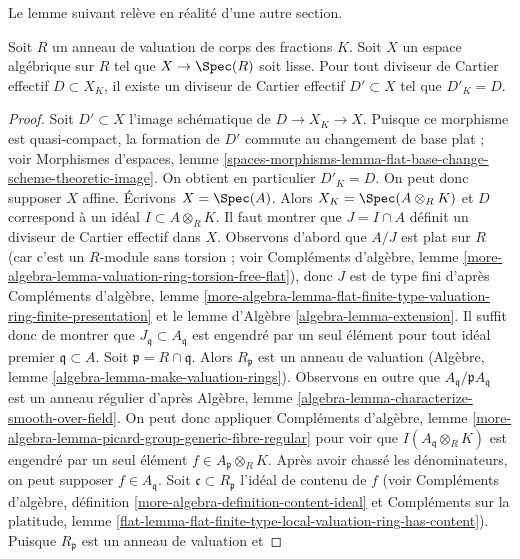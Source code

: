 \noindent
Le lemme suivant relève en réalité d'une autre section.

\begin{lemma}
\label{lemma-smooth-over-valuation-ring-effective-Cartier}
Soit $R$ un anneau de valuation de corps des fractions $K$.
Soit $X$ un espace algébrique sur $R$ tel que $X \to \Spec(R)$
soit lisse. Pour tout diviseur de Cartier effectif $D \subset X_K$,
il existe un diviseur de Cartier effectif $D' \subset X$
tel que $D'_K = D$.
\end{lemma}

\begin{proof}
Soit $D' \subset X$ l'image schématique de $D \to X_K \to X$.
Puisque ce morphisme est quasi-compact, la formation de $D'$
commute au changement de base plat ; voir
Morphismes d'espaces, lemme
\ref{spaces-morphisms-lemma-flat-base-change-scheme-theoretic-image}.
On obtient en particulier $D'_K = D$. On peut donc
supposer $X$ affine. Écrivons $X = \Spec(A)$.
Alors $X_K = \Spec(A \otimes_R K)$ et $D$ correspond à
un idéal $I \subset A \otimes_R K$. Il faut montrer que
$J = I \cap A$ définit un diviseur de Cartier effectif dans $X$.
Observons d'abord que $A/J$ est plat sur $R$ (car c'est un
$R$-module sans torsion ; voir Compléments d'algèbre, lemme
\ref{more-algebra-lemma-valuation-ring-torsion-free-flat}),
donc $J$ est de type fini d'après
Compléments d'algèbre, lemme
\ref{more-algebra-lemma-flat-finite-type-valuation-ring-finite-presentation}
et le
lemme d'Algèbre \ref{algebra-lemma-extension}.
Il suffit donc de montrer que $J_\mathfrak q \subset A_\mathfrak q$
est engendré par un seul élément pour tout idéal premier $\mathfrak q \subset A$.
Soit $\mathfrak p = R \cap \mathfrak q$. Alors
$R_\mathfrak p$ est un anneau de valuation
(Algèbre, lemme \ref{algebra-lemma-make-valuation-rings}).
Observons en outre que $A_\mathfrak q/\mathfrak p A_\mathfrak q$
est un anneau régulier d'après Algèbre, lemme
\ref{algebra-lemma-characterize-smooth-over-field}.
On peut donc appliquer Compléments d'algèbre, lemme
\ref{more-algebra-lemma-picard-group-generic-fibre-regular}
pour voir que $I(A_\mathfrak q \otimes_R K)$ est engendré par
un seul élément $f \in A_\mathfrak p \otimes_R K$.
Après avoir chassé les dénominateurs, on peut supposer $f \in A_\mathfrak q$.
Soit $\mathfrak c \subset R_\mathfrak p$ l'idéal de contenu de $f$
(voir Compléments d'algèbre, définition \ref{more-algebra-definition-content-ideal}
et Compléments sur la platitude, lemme
\ref{flat-lemma-flat-finite-type-local-valuation-ring-has-content}).
Puisque $R_\mathfrak p$ est un anneau de valuation et

\end{proof}
